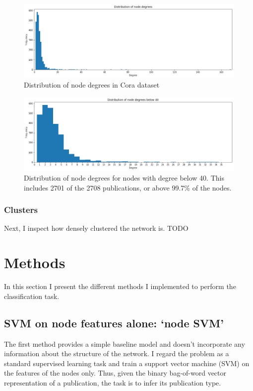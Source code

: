 \documentclass[12pt]{article}
\theoremstyle{definition}
\begin{document}
\begin{figure}[h]
	\includegraphics[width=1.0\textwidth]{node_degrees}
	\centering
	\caption{Distribution of node degrees in Cora dataset}
	\label{fig/node_degrees}
\end{figure}

\begin{figure}[h]
	\includegraphics[width=1.0\textwidth]{node_degrees_truncated}
	\centering
	\caption{Distribution of node degrees for nodes with degree below 40. This includes 2701 of the 2708 publications, or above 99.7\% of the nodes.}
	\label{fig/node_degrees_truncated}
\end{figure}

\subsubsection{Clusters}
Next, I inspect how densely clustered the network is. TODO

\section{Methods}
In this section I present the different methods I implemented to perform the classification task.

\subsection{SVM on node features alone: `node SVM'}
The first method provides a simple baseline model and doesn't incorporate any information about the structure of the network. I regard the problem as a standard supervised learning task and train a support vector machine (SVM) on the features of the nodes only. Thus, given the binary bag-of-word vector representation of a publication, the task is to infer its publication type. 
\end{document}
